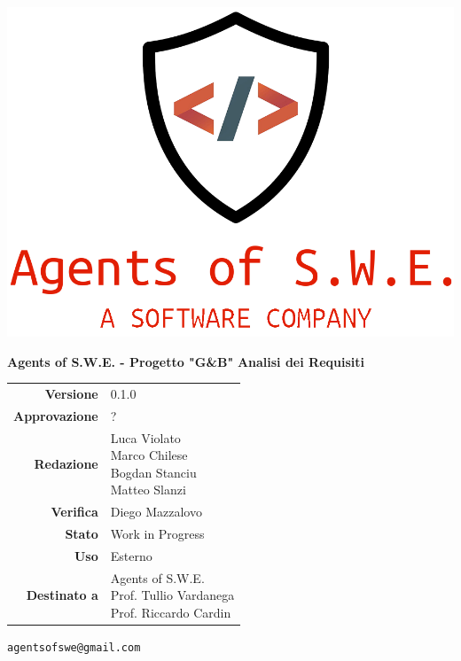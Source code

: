 


\begin{titlepage}
\thispagestyle{empty}

\begin{center}

\includegraphics[scale=0.3]{./images/logo.png} 

\large \textbf{Agents of S.W.E. - Progetto "G\&B"}
\vfill
\Huge \textbf{Analisi dei Requisiti}
\vfill
\large
\renewcommand{\arraystretch}{1.3}
\begin{tabular}{r|l}
\textbf{Versione} & 0.1.0\\
\textbf{Approvazione} & ?\\
\textbf{Redazione} & \parbox[t]{5cm}{Luca Violato\\Marco Chilese\\Bogdan Stanciu\\Matteo Slanzi}\\
\textbf{Verifica} & \parbox[t]{5cm}{Diego Mazzalovo}\\
\textbf{Stato} & Work in Progress\\
\textbf{Uso} & Esterno\\
\textbf{Destinato a} & \parbox[t]{5cm}{Agents of S.W.E. \\Prof. Tullio Vardanega\\Prof. Riccardo Cardin}
\end{tabular}
\vfill
\small
\texttt{agentsofswe@gmail.com}
\end{center}
\end{titlepage}

\pagebreak

